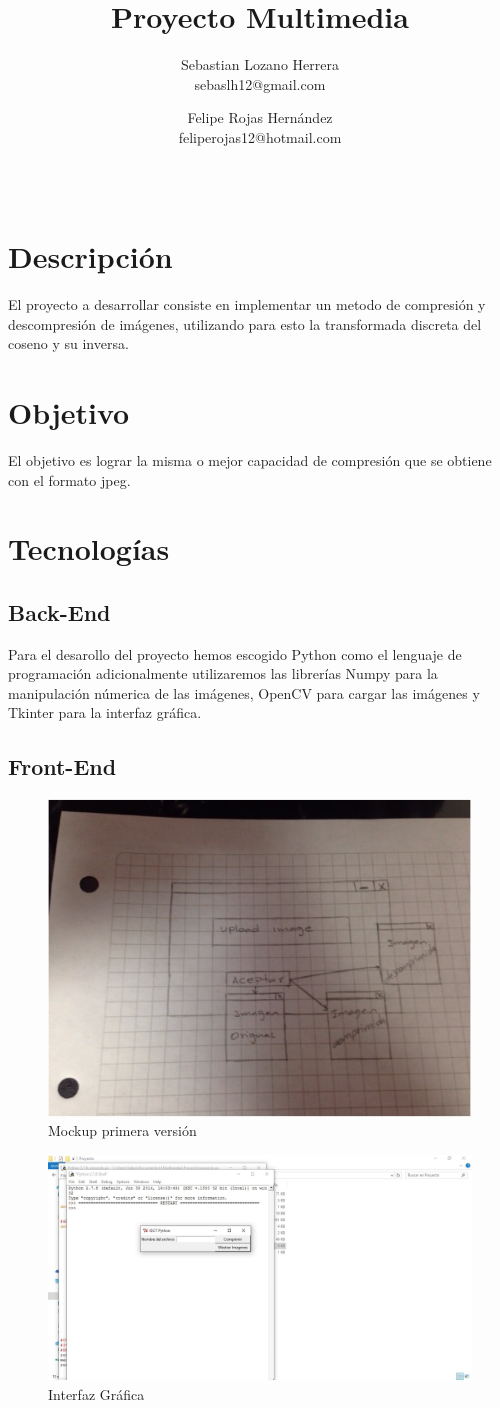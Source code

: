 \documentclass{article}
\title{Proyecto Multimedia}
\author{Sebastian Lozano Herrera\\ sebaslh12@gmail.com \and Felipe Rojas Hernández\\ feliperojas12@hotmail.com}
\date{\ }
\begin{document}
\maketitle
\section{Descripción}
El proyecto a desarrollar consiste en implementar un metodo de compresión y
descompresión de imágenes, utilizando para esto la transformada discreta del coseno y su inversa.
\section{Objetivo}
El objetivo es lograr la misma o mejor capacidad de compresión que se obtiene con el formato jpeg.
\section{Tecnologías}
\subsection{Back-End}
Para el desarollo del proyecto hemos escogido Python como el lenguaje de programación adicionalmente utilizaremos las librerías Numpy para la manipulación númerica de las imágenes, OpenCV para cargar las imágenes y Tkinter para la interfaz gráfica.
\newpage
\subsection{Front-End}
\begin{figure}[h]
\centering
\includegraphics[width=\textwidth]{mockup}
\caption{Mockup primera versión}
\end{figure}
\begin{figure}[h]
\centering
\includegraphics[width=\textwidth]{interfaz1}
\caption{Interfaz Gráfica}
\end{figure}
\end{document}
